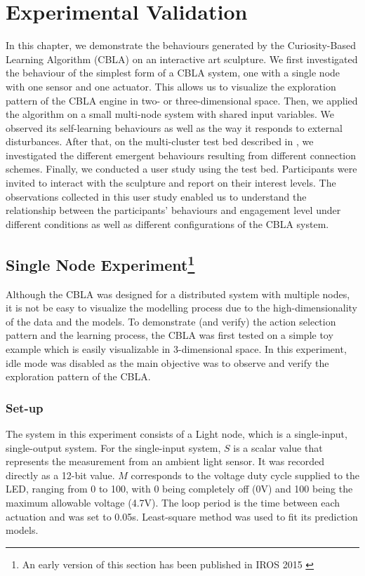 \chapter{Experimental Validation} \label{chap:validations}

In this chapter, we demonstrate the behaviours generated by the Curiosity-Based Learning Algorithm (CBLA) on an interactive art sculpture. We first investigated the behaviour of the simplest form of a CBLA system, one with a single node with one sensor and one actuator. This allows us to visualize the exploration pattern of the CBLA engine in two- or three-dimensional space. Then, we applied the algorithm on a small multi-node system with shared input variables. We observed its self-learning behaviours as well as the way it responds to external disturbances. After that, on the multi-cluster test bed described in , we investigated the different emergent behaviours resulting from different connection schemes. Finally, we conducted a user study using the test bed. Participants were invited to interact with the sculpture and report on their interest levels. The observations collected in this user study enabled us to understand the relationship between the participants' behaviours and engagement level under different conditions as well as different configurations of the CBLA system.


\section[Single Node Experiment]{Single Node Experiment\footnote{An early version of this section has been published in IROS 2015 \cite{Chan2015} }}\label{sec:single-node}

Although the CBLA was designed for a distributed system with multiple nodes, it is not be easy to visualize the modelling process due to the high-dimensionality of the data and the models. To demonstrate (and verify) the action selection pattern and the learning process, the CBLA was first tested on a simple toy example which is easily visualizable in 3-dimensional space. In this experiment, idle mode was disabled as the main objective was to observe and verify the exploration pattern of the CBLA. 

\subsection{Set-up}
The system in this experiment consists of a Light node, which is a single-input, single-output system. For the single-input system, $S$ is a scalar value that represents the measurement from an ambient light sensor. It was recorded directly as a 12-bit value. $M$ corresponds to the voltage duty cycle supplied to the LED, ranging from 0 to 100, with 0 being completely off (0V) and 100 being the maximum allowable voltage (4.7V). The loop period is the time between each actuation and was set to 0.05s. Least-square method was used to fit its prediction models.


